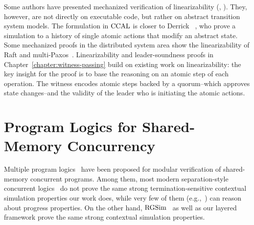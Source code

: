 Some
authors have presented mechanized verification of linearizability
(\eg, \cite{DGLMQueue,DerrickSW11}).
They, however, are not directly on executable
code, but rather on abstract transition system models.
The formulation in $\mathrm{CCAL}$  is closer to Derrick \etal~\cite{DerrickSW11}, who prove a simulation
to a history of single atomic actions that modify an abstract state.  
Some mechanized proofs in the distributed system area show 
the linearizability of Raft and
multi-Paxos~\cite{cppraft, ironfleet}.
%
Linearizability
and leader-soundness proofs in Chapter~\ref{chapter:witness-passing} build on existing work on
linearizability: the key insight for the proof is to base the reasoning on
an atomic step of each operation. 
The witness encodes atomic steps backed by a quorum--which approves state
changes--and the validity of the leader who is initiating the atomic actions.




\section{Program Logics for Shared-Memory Concurrency}
\label{chatper:related:sec:program-logics-for-shared-memory-concurrency}

Multiple program  logics~
\cite{cap10, ohearn:concur04,brookes:concur04,feng07:sagl,vafeiadis:marriage,LRG,verifast,gotsman13,Turon13popl,Turon13icfp,nanevski13,nanevski14,
sergey15,sergey15pldi,pinto14,iris15,civl15,pinto16,xu16}
have been proposed for 
modular verification of shared-memory concurrent programs. 
Among them, most modern separation-style concurrent logics~
\cite{cap10,Turon13popl,sergey15pldi,pinto14,iris15,pinto16} do
not prove the same strong termination-sensitive contextual simulation
properties  our work does,
while very few of them (e.g.,~\cite{pinto16})
can reason about progress properties.
On the other hand,
$\mathrm{RGSim}$~\cite{RGSim} as well as our layered framework prove the same strong contextual simulation properties.

